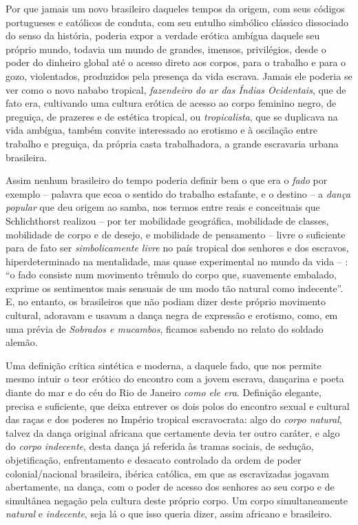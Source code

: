 Por que jamais um novo brasileiro daqueles tempos da origem, com seus
códigos portugueses e católicos de conduta, com seu entulho simbólico
clássico dissociado do senso da história, poderia expor a verdade
erótica ambígua daquele seu próprio mundo, todavia um mundo de grandes,
imensos, privilégios, desde o poder do dinheiro global até o acesso
direto aos corpos, para o trabalho e para o gozo, violentados,
produzidos pela presença da vida escrava. Jamais ele poderia se ver como
o novo nababo tropical, \emph{fazendeiro do ar das Índias Ocidentais},
que de fato era, cultivando uma cultura erótica de acesso ao corpo
feminino negro, de preguiça, de prazeres e de estética tropical, ou
\emph{tropicalista}, que se duplicava na vida ambígua, também convite
interessado ao erotismo e à oscilação entre trabalho e preguiça, da
própria casta trabalhadora, a grande escravaria urbana brasileira.

Assim nenhum brasileiro do tempo poderia definir bem o que era o
\emph{fado} por exemplo -- palavra que ecoa o sentido do trabalho
estafante, e o destino -- a \emph{dança} \emph{popular} que deu origem
ao samba, nos termos entre reais e conceituais que Schlichthorst
realizou -- por ter mobilidade geográfica, mobilidade de classes,
mobilidade de corpo e de desejo, e mobilidade de pensamento -- livre o
suficiente para de fato ser \emph{simbolicamente livre} no país tropical
dos senhores e dos escravos, hiperdeterminado na mentalidade, mas quase
experimental no mundo da vida -- : ``o fado consiste num movimento
trêmulo do corpo que, suavemente embalado, exprime os sentimentos mais
sensuais de um modo tão natural como indecente''. E, no entanto, os
brasileiros que não podiam dizer deste próprio movimento cultural,
adoravam e usavam a dança negra de expressão e erotismo, como, em uma
prévia de \emph{Sobrados e mucambos}, ficamos sabendo no relato do
soldado alemão.

Uma definição crítica sintética e moderna, a daquele fado, que nos
permite mesmo intuir o teor erótico do encontro com a jovem escrava,
dançarina e poeta diante do mar e do céu do Rio de Janeiro \emph{como
ele era}. Definição elegante, precisa e suficiente, que deixa entrever
os dois polos do encontro sexual e cultural das raças e dos poderes no
Império tropical escravocrata: algo do \emph{corpo natural}, talvez da
dança original africana que certamente devia ter outro caráter, e algo
do \emph{corpo indecente}, desta dança já referida às tramas sociais, de
sedução, objetificação, enfrentamento e desacato controlado da ordem de
poder colonial/nacional brasileira, ibérica católica, em que as
escravizadas jogavam abertamente, na dança, com o poder de acesso dos
senhores ao seu corpo e de simultânea negação pela cultura deste próprio
corpo. Um corpo simultaneamente \emph{natural} e \emph{indecente}, seja
lá o que isso queria dizer, assim africano e brasileiro.

